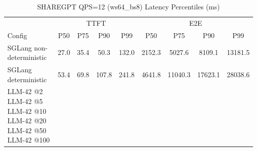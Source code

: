 \begin{table}[htbp]
\centering
\caption{SHAREGPT QPS=12 (ws64_bs8) Latency Percentiles (ms)}
\label{tab:sharegpt_qps12_ws64_bs8}
\begin{tabular}{l|cccc|cccc}
\toprule
& \multicolumn{4}{c|}{TTFT} & \multicolumn{4}{c}{E2E} \\
Config & P50 & P75 & P90 & P99 & P50 & P75 & P90 & P99 \\
\midrule
SGLang non-deterministic & 27.0 & 35.4 & 50.3 & 132.0 & 2152.3 & 5027.6 & 8109.1 & 13181.5 \\
SGLang deterministic & 53.4 & 69.8 & 107.8 & 241.8 & 4641.8 & 11040.3 & 17623.1 & 28038.6 \\
LLM-42 @2%
LLM-42 @5%
LLM-42 @10%
LLM-42 @20%
LLM-42 @50%
LLM-42 @100%
\bottomrule
\end{tabular}
\end{table}
